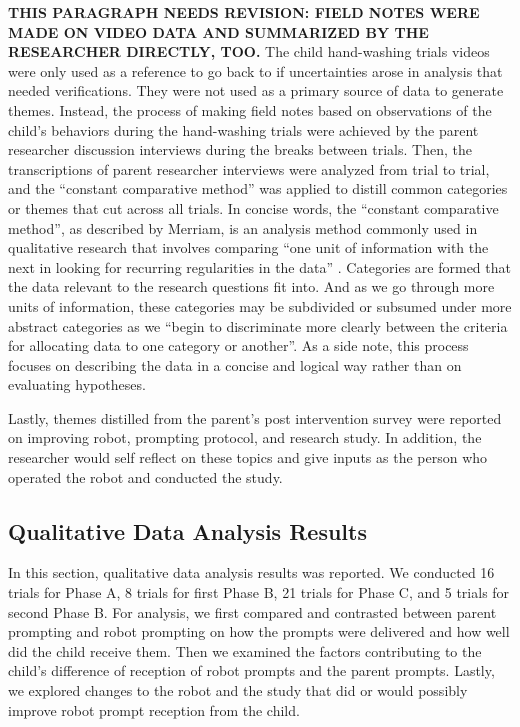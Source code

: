 \textbf{THIS PARAGRAPH NEEDS REVISION: FIELD NOTES WERE MADE ON VIDEO DATA AND SUMMARIZED BY THE RESEARCHER DIRECTLY, TOO.}
The child hand-washing trials videos were only used as a reference to go back to if uncertainties arose in analysis that needed verifications.  They were not used as a primary source of data to generate themes.  Instead, the process of making field notes based on observations of the child's behaviors during the hand-washing trials were achieved by the parent researcher discussion interviews during the breaks between trials.  Then, the transcriptions of parent researcher interviews were analyzed from trial to trial, and the ``constant comparative method'' was applied to distill common categories or themes that cut across all trials.  In concise words, the ``constant comparative method'', as described by Merriam, is an analysis method commonly used in qualitative research that involves comparing ``one unit of information with the next in looking for recurring regularities in the data'' \cite{merriam2014qualitative}.  Categories are formed that the data relevant to the research questions fit into.  And as we go through more units of information, these categories may be subdivided or subsumed under more abstract categories as we ``begin to discriminate more clearly between the criteria for allocating data to one category or another''.  As a side note, this process focuses on describing the data in a concise and logical way rather than on evaluating hypotheses.

Lastly, themes distilled from the parent's post intervention survey were reported on improving robot, prompting protocol, and research study.  In addition, the researcher would self reflect on these topics and give inputs as the person who operated the robot and conducted the study.


\subsection{Qualitative Data Analysis Results}
\label{sec:QualitativeData_results}
In this section, qualitative data analysis results was reported.  We conducted 16 trials for Phase A, 8 trials for first Phase B, 21 trials for Phase C, and 5 trials for second Phase B.  For analysis, we first compared and contrasted between parent prompting and robot prompting on how the prompts were delivered and how well did the child receive them.  Then we examined the factors contributing to the child's difference of reception of robot prompts and the parent prompts.  Lastly, we explored changes to the robot and the study that did or would possibly improve robot prompt reception from the child.

